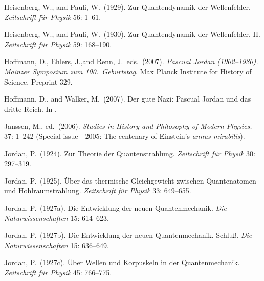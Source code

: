 \documentclass[12pt]{elsart}
\begin{document}
{\begin{thebibliography}{}

 Heisenberg, W., and Pauli, W.\ (1929). Zur Quantendynamik der Wellenfelder. {\it Zeitschrift f\"{u}r Physik} 56: 1--61.

 Heisenberg, W., and Pauli, W.\  (1930). Zur Quantendynamik der Wellenfelder, II. {\it Zeitschrift f\"{u}r Physik} 59: 168--190.

  Hoffmann, D.,  Ehlers, J.,and Renn, J.\ eds.\ (2007). {\it Pascual Jordan (1902--1980). Mainzer Symposium zum 100.\ Geburtstag}. Max Planck Institute for History of Science, Preprint 329. 

 Hoffmann, D., and Walker, M.\ (2007). Der gute Nazi: Pascual Jordan und das dritte Reich. In \citep[pp.\ 83--112]{Hoffmann 2007}.


 Janssen, M., ed.\ (2006). {\it Studies in History and Philosophy of Modern Physics.} 37: 1--242 (Special issue---2005: The centenary of Einstein's {\it annus mirabilis}).

 Jordan, P.\ (1924). Zur Theorie der Quantenstrahlung. {\it Zeitschrift f\"{u}r Physik} 30: 297--319.

 Jordan, P.\  (1925). \"Uber das thermische Gleichgewicht zwischen Quantenatomen und Hohlraumstrahlung. {\it Zeitschrift f\"{u}r Physik} 33: 649--655.

 Jordan, P.\  (1927a). Die Entwicklung der neuen Quantenmechanik. {\it Die Naturwissenschaften} 15: 614--623.

 Jordan, P.\  (1927b). Die Entwicklung der neuen Quantenmechanik. Schlu\ss.  {\it Die Naturwissenschaften} 15: 636--649.

 Jordan, P.\  (1927c). \"Uber Wellen und Korpuskeln in der Quantenmechanik. {\it Zeitschrift f\"{u}r Physik} 45: 766--775.


\end{thebibliography}}
\end{document}

